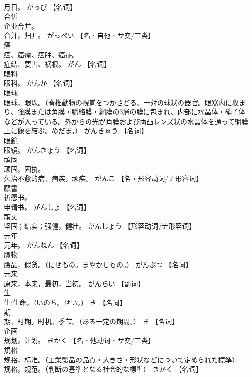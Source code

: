 \documentclass[8pt]{extreport}
\begin{document}
\begin{CJK}{UTF8}{min}
\\	月日。	がっぴ		【名词】
\\	合併	
\\	企业合并。 
\\	合并，归并。	がっぺい		【名・自他・サ变/三类】
\\	癌	
\\	癌、癌瘤、癌肿、癌症。 
\\	症结、要害、祸根。	がん		【名词】
\\	眼科	
\\	眼科。	がんか		【名词】
\\	眼球	
\\	眼球，眼珠。（脊椎動物の視覚をつかさどる、一対の球状の器官。眼窩内に収まり、強膜または角膜・脈絡膜・網膜の3層の膜に包まれ、内部に水晶体・硝子体などが入っている。外からの光が角膜および両凸レンズ状の水晶体を通って網膜上に像を結ぶ。めだま。）	がんきゅう		【名词】
\\	眼鏡	
\\	眼镜。	がんきょう		【名词】
\\	頑固	
\\	顽固，固执。 
\\	久治不愈的病，痼疾，顽疾。	がんこ		【名・形容动词/ナ形容词】
\\	願書	
\\	祈愿书。 
\\	申请书。	がんしょ		【名词】
\\	頑丈	
\\	坚固；结实；强健，健壮。	がんじょう		【形容动词/ナ形容词】
\\	元年	
\\	元年。	がんねん		【名词】
\\	贋物	
\\	赝品，假货。（にせもの。まやかしもの。）	がんぶつ		【名词】
\\	元来	
\\	原来，本来，最初，当初。	がんらい		【副词】
\\	生	
\\	生;生命。（いのち。せい。）	き		【名词】
\\	期	
\\	期，时期，时机，季节。（ある一定の期間。）	き		【名词】
\\	企画	
\\	规划，计划。	きかく		【名・他动词・サ变/三类】
\\	規格	
\\	规格，标准。（工業製品の品質・大きさ・形状などについて定められた標準） 
\\	规格，规范。（判断の基準となる社会的な標準）	きかく		【名词】

\end{CJK}
\end{document}
